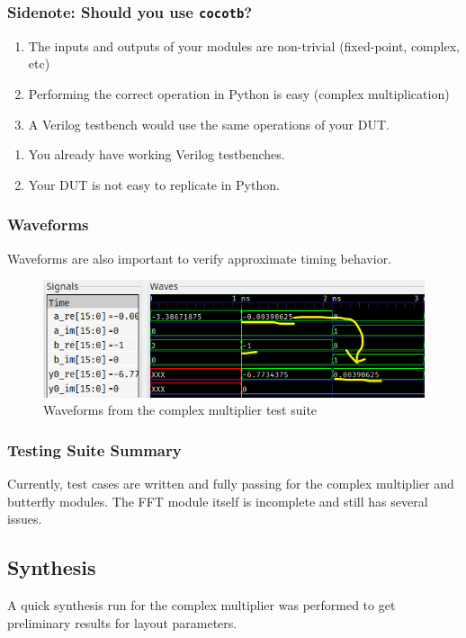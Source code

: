 \documentclass{beamer}
\begin{document}
\begin{frame}
	\frametitle{Sidenote: Should you use \texttt{cocotb}?}
	\begin{enumerate}
		\item The inputs and outputs of your modules are 
			non-trivial (fixed-point, complex, etc)
		\item Performing the correct operation in 
			Python is easy (complex multiplication)
		\item A Verilog testbench would use the 
			same operations of your DUT.
	\end{enumerate}

	\begin{enumerate}
		\item You already have working Verilog testbenches.
		\item Your DUT is not easy to replicate in Python.
	\end{enumerate}
\end{frame}

\begin{frame}
	\frametitle{Waveforms}
	Waveforms are also important to verify approximate timing behavior.
	\begin{figure}
		\includegraphics[width=\linewidth]{./../first_report/figures/cplx_mul_waveform.png}
		\caption{Waveforms from the complex multiplier test suite}
		\centering
	\end{figure}
\end{frame}

\begin{frame}
	\frametitle{Testing Suite Summary}
	Currently, test cases are written and fully passing for the complex multiplier
	and butterfly modules. The FFT module itself is incomplete and still has several issues.
\end{frame}

\subsection{Synthesis}
\begin{frame}
A quick synthesis run for the complex multiplier was performed to get preliminary results
for layout parameters.
\end{frame}
\end{document}
